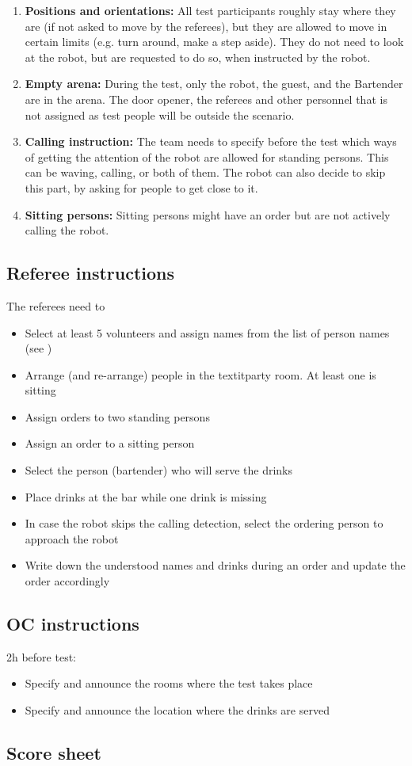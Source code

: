 \begin{enumerate}
	\item \textbf{Positions and orientations:} All test participants roughly stay where they are (if not asked to move by the referees), but they are allowed to move in certain limits (e.g. turn around, make a step aside). They do not need to look at the robot, but are requested to do so, when instructed by the robot.

	\item \textbf{Empty arena:} During the test, only the robot, the guest, and the Bartender are in the arena. The door opener, the referees and other personnel that is not assigned as test people will be outside the scenario.

	\item \textbf{Calling instruction:} The team needs to specify before the test which ways of getting the attention of the robot are allowed for standing persons. This can be waving, calling, or both of them. The robot can also decide to skip this part, by asking for people to get close to it.
	
	\item \textbf{Sitting persons:} Sitting persons might have an order but are not actively calling the robot.
\end{enumerate}

\subsection{Referee instructions}

The referees need to
\begin{itemize}
	\item Select at least 5 volunteers and assign names from the list of person names (see )
	\item Arrange (and re-arrange) people in the textit{party room}. At least one is sitting
	\item Assign orders to two standing persons
	\item Assign an order to a sitting person
	\item Select the person (bartender) who will serve the drinks
	\item Place drinks at the bar while one drink is missing
	\item In case the robot skips the calling detection, select the ordering person to approach the robot
	\item Write down the understood names and drinks during an order and update the order accordingly
\end{itemize}

\subsection{OC instructions}

2h before test:
\begin{itemize}
	\item Specify and announce the rooms where the test takes place
	\item Specify and announce the location where the drinks are served
\end{itemize}

\newpage
\subsection{Score sheet}

